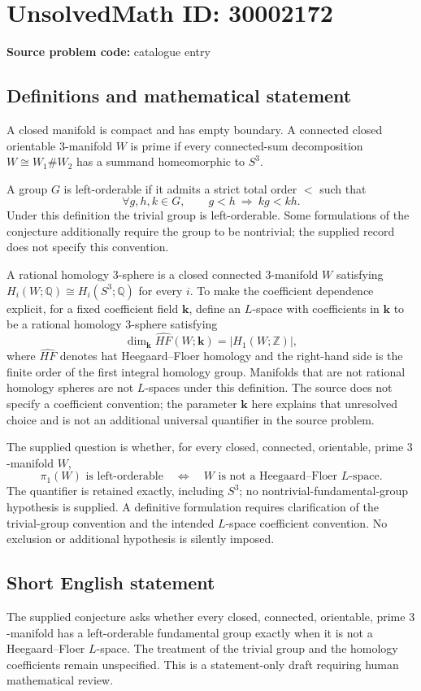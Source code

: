 \documentclass[11pt]{article}
\newcommand{\Z}{\mathbb{Z}}
\newcommand{\Q}{\mathbb{Q}}
\begin{document}
\section*{UnsolvedMath ID: 30002172}
\textbf{Source problem code:} catalogue entry
\subsection{Definitions and mathematical statement}
A closed manifold is compact and has empty boundary. A connected closed orientable \(3\)-manifold \(W\) is prime if every connected-sum decomposition \(W\cong W_1\#W_2\) has a summand homeomorphic to \(S^3\).

A group \(G\) is left-orderable if it admits a strict total order \(<\) such that
\[
\forall g,h,k\in G,\qquad g<h\ \Longrightarrow\ kg<kh.
\]
Under this definition the trivial group is left-orderable. Some formulations of the conjecture additionally require the group to be nontrivial; the supplied record does not specify this convention.

A rational homology \(3\)-sphere is a closed connected \(3\)-manifold \(W\) satisfying \(H_i(W;\Q)\cong H_i(S^3;\Q)\) for every \(i\). To make the coefficient dependence explicit, for a fixed coefficient field \(\mathbf{k}\), define an \(L\)-space with coefficients in \(\mathbf{k}\) to be a rational homology \(3\)-sphere satisfying
\[
\dim_{\mathbf{k}}\widehat{HF}(W;\mathbf{k})
=\lvert H_1(W;\Z)\rvert,
\]
where \(\widehat{HF}\) denotes hat Heegaard--Floer homology and the right-hand side is the finite order of the first integral homology group. Manifolds that are not rational homology spheres are not \(L\)-spaces under this definition. The source does not specify a coefficient convention; the parameter \(\mathbf{k}\) here explains that unresolved choice and is not an additional universal quantifier in the source problem.

The supplied question is whether, for every closed, connected, orientable, prime \(3\)-manifold \(W\),
\[
\pi_1(W)\text{ is left-orderable}
\quad\Longleftrightarrow\quad
W\text{ is not a Heegaard--Floer }L\text{-space}.
\]
The quantifier is retained exactly, including \(S^3\); no nontrivial-fundamental-group hypothesis is supplied. A definitive formulation requires clarification of the trivial-group convention and the intended \(L\)-space coefficient convention. No exclusion or additional hypothesis is silently imposed.
\subsection{Short English statement}
The supplied conjecture asks whether every closed, connected, orientable, prime \(3\)-manifold has a left-orderable fundamental group exactly when it is not a Heegaard--Floer \(L\)-space. The treatment of the trivial group and the homology coefficients remain unspecified. This is a statement-only draft requiring human mathematical review.
\end{document}
